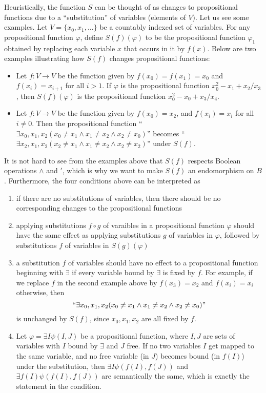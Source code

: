 \documentclass[12pt]{article}
\begin{document}
Heuristically, the function $S$ can be thought of as changes to propositional functions due to a ``substitution'' of variables (elements of $V$).  Let us see some examples.  Let $V=\lbrace x_0,x_1,\ldots \rbrace$ be a countably indexed set of variables.  For any propositional function $\varphi$, define $S(f)(\varphi)$ to be the propositional function $\varphi_1$ obtained by replacing each variable $x$ that occurs in it by $f(x)$.  Below are two examples illustrating how $S(f)$ changes propositional functions:
\begin{itemize}
\item
Let $f:V \to V$ be the function given by $f(x_0)=f(x_1)=x_0$ and $f(x_i)=x_{i+1}$ for all $i>1$.  If $\varphi$ is the propositional function $x_0^2-x_1+x_2/x_3$, then $S(f)(\varphi)$ is the propositional function $x_0^2-x_0+x_3/x_4$.  
\item
Let $f:V\to V$ be the function given by $f(x_0)=x_2$, and $f(x_i)=x_i$ for all $i\ne 0$.  Then the propositional function ``$\exists x_0,x_1,x_2 (x_0\ne x_1 \wedge x_1\ne x_2 \wedge x_2\ne x_0)$'' becomes ``$\exists x_2,x_1,x_2 (x_2\ne x_1 \wedge x_1\ne x_2 \wedge x_2\ne x_2)$'' under $S(f)$.
\end{itemize}
It is not hard to see from the examples above that $S(f)$ respects Boolean operations $\wedge$ and $'$, which is why we want to make $S(f)$ an endomorphism on $B$.  Furthermore, the four conditions above can be interpreted as 
\begin{enumerate}
\item if there are no substitutions of variables, then there should be no corresponding changes to the propositional functions
\item applying substitutions $f\circ g$ of varaibles in a propositional function $\varphi$ should have the same effect as applying substitutions $g$ of variables in $\varphi$, followed by substitutions $f$ of variables in $S(g)(\varphi)$
\item a substitution $f$ of variables should have no effect to a propositional function beginning with $\exists$ if every variable bound by $\exists$ is fixed by $f$.  For example, if we replace $f$ in the second example above by $f(x_3)=x_2$ and $f(x_i)=x_i$ otherwise, then $$``\exists x_0,x_1,x_2 (x_0\ne x_1 \wedge x_1\ne x_2 \wedge x_2\ne x_0)"$$ is unchanged by $S(f)$, since $x_0,x_1,x_2$ are all fixed by $f$.
\item Let $\varphi=\exists I \psi(I,J)$ be a propositional function, where $I,J$ are sets of variables with $I$ bound by $\exists$ and $J$ free.  If no two variables $I$ get mapped to the same variable, and no free variable (in $J$) becomes bound (in $f(I)$) under the substitution, then $\exists I \psi(f(I),f(J))$ and $\exists f(I) \psi(f(I),f(J))$ are semantically the same, which is exactly the statement in the condition.
\end{enumerate}
\end{document}
